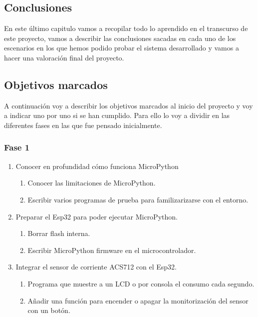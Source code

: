 \begin{titlepage}
\chapter{Conclusiones}
En este último capitulo vamos a recopilar todo lo aprendido en el transcurso de este proyecto, vamos a describir las conclusiones sacadas en cada uno de los escenarios en los que hemos podido probar el sistema desarrollado y vamos a hacer una valoración final del proyecto.\\
\section{Objetivos marcados}
A continuación voy a describir los objetivos marcados al inicio del proyecto y voy a indicar uno por uno si se han cumplido. Para ello lo voy a dividir en las diferentes fases en las que fue pensado inicialmente.
\subsection{Fase 1}
\begin{enumerate}
    \item Conocer en profundidad cómo funciona MicroPython
    \begin{enumerate}
        \item Conocer las limitaciones de MicroPython. \checkmark
        \item Escribir varios programas de prueba para familizarizarse con el entorno. \checkmark
    \end{enumerate}
    \item Preparar el Esp32 para poder ejecutar MicroPython.
    \begin{enumerate}
        \item Borrar flash interna. \checkmark
        \item Escribir MicroPython firmware en el microcontrolador. \checkmark
    \end{enumerate}
    \item Integrar el sensor de corriente ACS712 con el Esp32. 
    \begin{enumerate}
        \item Programa que muestre a un LCD o por consola el consumo cada segundo. \checkmark
        \item Añadir una función para encender o apagar la monitorización del sensor con un botón.\checkmark
    \end{enumerate}
\end{enumerate}


\end{titlepage}
